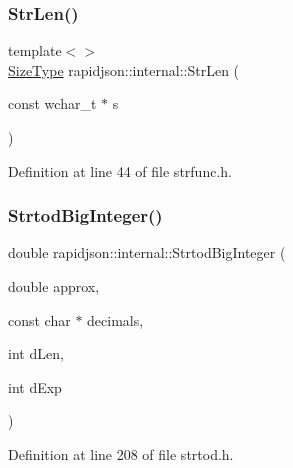 \subsubsection{\texorpdfstring{StrLen()}{StrLen()}\hspace{0.1cm}{\footnotesize\ttfamily [3/3]}}
{\footnotesize\ttfamily template$<$$>$ \\
\mbox{\hyperlink{namespacerapidjson_a44eb33eaa523e36d466b1ced64b85c84}{Size\+Type}} rapidjson\+::internal\+::\+Str\+Len (\begin{DoxyParamCaption}\item[{const wchar\+\_\+t $\ast$}]{s }\end{DoxyParamCaption})}



Definition at line 44 of file strfunc.\+h.


\begin{DoxyCode}{0}

\end{DoxyCode}
\mbox{\label{namespacerapidjson_1_1internal_aeb0c7910094111c91cd31339bf707950}} 
\subsubsection{\texorpdfstring{StrtodBigInteger()}{StrtodBigInteger()}}
{\footnotesize\ttfamily double rapidjson\+::internal\+::\+Strtod\+Big\+Integer (\begin{DoxyParamCaption}\item[{double}]{approx,  }\item[{const char $\ast$}]{decimals,  }\item[{int}]{d\+Len,  }\item[{int}]{d\+Exp }\end{DoxyParamCaption})}



Definition at line 208 of file strtod.\+h.


